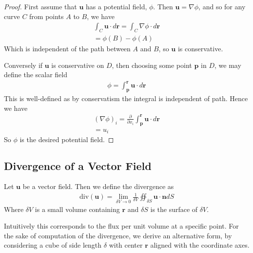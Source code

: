 \documentclass[]{article}
\begin{document}
\begin{proof}
		First assume that $\mathbf{u}$ has a potential field, $\phi$. Then $\mathbf{u} = \nabla \phi$, and so for any curve $C$ from points $A$ to $B$, we have
		\begin{align*}
				\int_C \mathbf{u} \cdot d\mathbf{r} = \int_C \nabla \phi \cdot d\mathbf{r} \\
				= \phi(B) - \phi(A)
		\end{align*}
		Which is independent of the path between $A$ and $B$, so $\mathbf{u}$ is conservative.

		Conversely if $ \mathbf{u}$ is conservative on $D$, then choosing some point $\mathbf{p}$ in $D$, we may define the scalar field 
		\begin{align*}
				\phi = \int_\mathbf{p}^\mathbf{r} \mathbf{u} \cdot d\mathbf{r}
		\end{align*}
		This is well-defined as by conservatism the integral is independent of path. Hence we have
		\begin{align*}
				(\nabla \phi)_i = \frac{\partial}{\partial x_i} \int_\mathbf{p}^\mathbf{r} \mathbf{u} \cdot d \mathbf{r} \\
				= u_i
		\end{align*} 
		So $\phi$ is the desired potential field.
\end{proof}

\subsection{Divergence of a Vector Field}

\begin{defi} [Divergence]
		Let $\mathbf{u}$ be a vector field. Then we define the divergence as 
		\begin{align*}
				\text{div}(\mathbf{u}) = \lim_{\delta V \to 0} \frac{1}{\delta V} \oiint_{\delta S} \mathbf{u} \cdot \mathbf{n} dS	
		\end{align*}
		Where $\delta V$ is a small volume containing $\mathbf{r}$ and $\delta S$ is the surface of $\delta V$.
\end{defi}

Intuitively this corresponds to the flux per unit volume at a specific point. For the sake of computation of the divergence, we derive an alternative form, by considering a cube of side length $\delta$ with center $\mathbf{r}$ aligned with the coordinate axes. 
\end{document}
